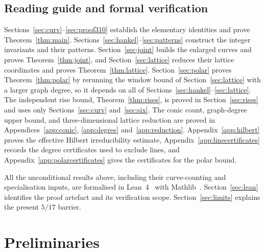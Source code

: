 \documentclass[11pt]{article}
\theoremstyle{definition}
\theoremstyle{remark}
\begin{document}
\subsection*{Reading guide and formal verification}
Sections~\ref{sec:curv}--\ref{sec:proof310} establish the elementary identities and
prove Theorem~\ref{thm:main}. Sections~\ref{sec:hankel}--\ref{sec:patterns} construct the
integer invariants and their patterns. Section~\ref{sec:joint} builds the enlarged
curves and proves Theorem~\ref{thm:joint}, and Section~\ref{sec:lattice} reduces their
lattice coordinates and proves Theorem~\ref{thm:lattice}. Section~\ref{sec:polar} proves
Theorem~\ref{thm:polar} by rerunning the window bound of Section~\ref{sec:lattice} with a
larger graph degree, so it depends on all of
Sections~\ref{sec:hankel}--\ref{sec:lattice}. The independent rise bound,
Theorem~\ref{thm:rises}, is proved in Section~\ref{sec:rises} and uses only
Sections~\ref{sec:curv} and~\ref{sec:six}. The conic count, graph-degree
upper bound, and three-dimensional lattice reduction are proved in
Appendices~\ref{app:conic}, \ref{app:degree} and~\ref{app:reduction}.
Appendix~\ref{app:hilbert} proves the effective Hilbert irreducibility estimate,
Appendix~\ref{app:linecertificates} records the degree certificates used to exclude
lines, and Appendix~\ref{app:polarcertificates} gives the certificates for the polar bound.

All the unconditional results above, including their curve-counting and
specialisation inputs, are formalised in Lean~4~\cite{Lean} with
Mathlib~\cite{Mathlib}. Section~\ref{sec:lean} identifies the proof artefact
and its verification scope. Section~\ref{sec:limits} explains the present
$5/17$ barrier.

\section{Preliminaries}
\end{document}
